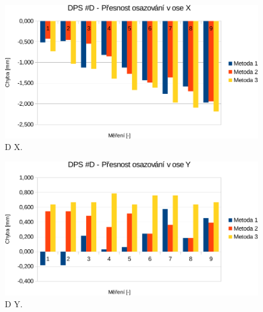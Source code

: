 \begin{figure}[H]
  \centering
    \includegraphics[width=0.9\linewidth]{pdf/D_X-crop2.pdf}%
    \caption{D X.}
    \label{graf:DX}
\end{figure}
\begin{figure}[H]
  \centering
    \includegraphics[width=0.9\linewidth]{pdf/D_Y-crop2.pdf}%
    \caption{D Y.}
    \label{graf:DY}
\end{figure}


